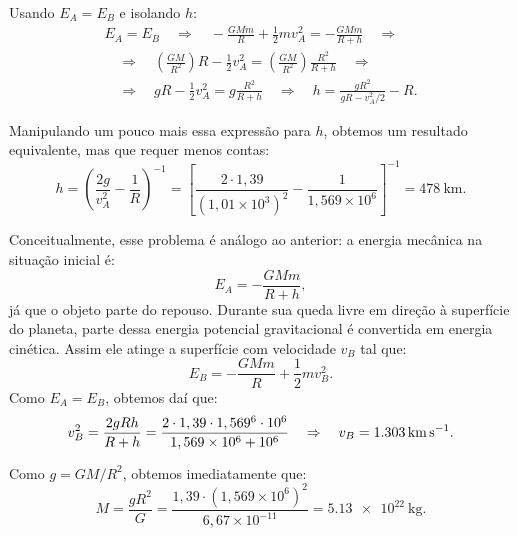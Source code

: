 \documentclass[a4paper]{article}
\newcommand\myrightarrow{\quad\Rightarrow\quad}
\begin{document}
\begin{resolucoes}
\begin{exercicio}
\begin{compactenum}[(a)]
  Usando $E_A = E_B$ e isolando $h$:
  \begin{gather*}
  E_A = E_B \myrightarrow -\frac{GMm}{R} + \frac{1}{2}mv_A^2 = -\frac{GMm}{R+h} \myrightarrow\\
  \myrightarrow\left(\frac{GM}{R^2}\right)R - \frac{1}{2}v_A^2 = \left(\frac{GM}{R^2}\right)\frac{R^2}{R+h} \myrightarrow\\
  \myrightarrow gR - \frac{1}{2}v_A^2 = g\frac{R^2}{R+h} \myrightarrow h = \frac{gR^2}{gR-v_A^2/2}-R.
  \end{gather*}
  
  Manipulando um pouco mais essa expressão para $h$, obtemos um resultado equivalente, mas que requer menos contas:
  \begin{equation*}
  h = \left(\frac{2g}{v_A^2} - \frac{1}{R}\right)^{-1} = \left[\frac{2\cdot 1,39}{\left(1,01\times10^{3}\right)^2} - \frac{1}{1,569\times10^{6}}\right]^{-1} = \SI{478}{\kilo\metre}.
  \end{equation*}

  \item Conceitualmente, esse problema é análogo ao anterior: a energia mecânica na situação inicial é:
  \begin{equation*}
  E_A = -\frac{GMm}{R+h},
  \end{equation*}
  já que o objeto parte do repouso.
  Durante sua queda livre em direção à superfície do planeta, parte dessa energia potencial gravitacional é convertida em energia cinética.
  Assim ele atinge a superfície com velocidade $v_B$ tal que:
  \begin{equation*}
  E_B = -\frac{GMm}{R} + \frac{1}{2}mv_B^2.
  \end{equation*}
  Como $E_A = E_B$, obtemos daí que:
  \begin{equation*}
  v_B^2 = \frac{2gRh}{R+h} = \frac{2\cdot1,39\cdot1,569\time10^{6}\cdot10^6}{1,569\times10^{6}+10^{6}} \myrightarrow v_B = \SI{1.303}{\kilo\metre\per\second}.
  \end{equation*}

  \item Como $g=GM/R^2$, obtemos imediatamente que:
  \begin{equation*}
  M = \frac{gR^2}{G} = \frac{1,39\cdot \left(1,569\times10^{6}\right)^2}{6,67\times10^{-11}} = \SI{5.13e22}{\kilo\gram}.
  \end{equation*}
  
  \end{compactenum}
  \end{exercicio}
  

\end{resolucoes}
\end{document}
